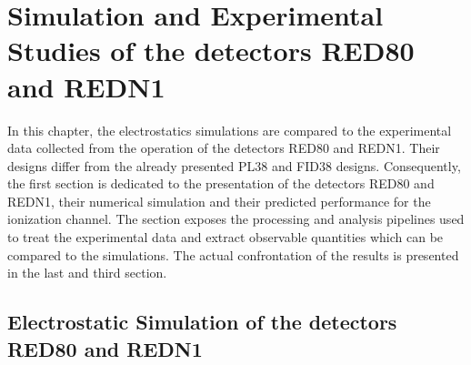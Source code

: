 
\chapter{Simulation and Experimental Studies of the detectors RED80 and REDN1} %

\label{ChapterElectrodesExperimental} %



In this chapter, the electrostatics simulations are compared to the experimental data collected from the operation of the detectors RED80 and REDN1.
Their designs differ from the already presented PL38 and FID38 designs.
Consequently, the first section is dedicated to the presentation of the detectors RED80 and REDN1, their numerical simulation and their predicted performance for the ionization channel.
The section exposes the processing and analysis pipelines used to treat the experimental data and extract observable quantities which can be compared to the simulations.
The actual confrontation of the results is presented in the last and third section.


\section{Electrostatic Simulation of the detectors RED80 and REDN1}

